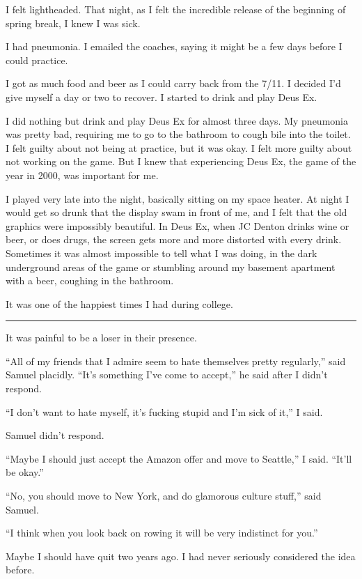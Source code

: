 I felt lightheaded.  That night, as I felt the incredible release of the
beginning of spring break, I knew I was sick.  

I had pneumonia.  I emailed the coaches, saying it might be a few days before I
could practice.

I got as much food and beer as I could carry back from the 7/11.  I decided I'd
give myself a day or two to recover.  I started to drink and play Deus Ex.  

I did nothing but drink and play Deus Ex for almost three days.  My pneumonia
was pretty bad, requiring me to go to the bathroom to cough bile into the
toilet.  I felt guilty about not being at practice, but it was okay.  I felt
more guilty about not working on the game.  But I knew that experiencing Deus
Ex, the game of the year in 2000, was important for me.

I played very late into the night, basically sitting on my space heater.  At
night I would get so drunk that the display swam in front of me, and I felt that
the old graphics were impossibly beautiful.  In Deus Ex, when JC Denton drinks
wine or beer, or does drugs, the screen gets more and more distorted with every
drink.  Sometimes it was almost impossible to tell what I was doing, in the dark
underground areas of the game or stumbling around my basement apartment with a
beer, coughing in the bathroom.

It was one of the happiest times I had during college.

\plainfancybreak{12pt}{2}{* * *}

It was painful to be a loser in their presence.  

``All of my friends that I admire seem to hate themselves pretty regularly,''
said Samuel placidly.  ``It's something I've come to accept,'' he said after I
didn't respond.

``I don't want to hate myself, it's fucking stupid and I'm sick of it,'' I said.  

Samuel didn't respond.

``Maybe I should just accept the Amazon offer and move to Seattle,'' I said.
``It'll be okay.''

``No, you should move to New York, and do glamorous culture stuff,'' said
Samuel.

``I think when you look back on rowing it will be very indistinct for you.'' 

Maybe I should have quit two years ago.  I had never seriously considered the
idea before.

